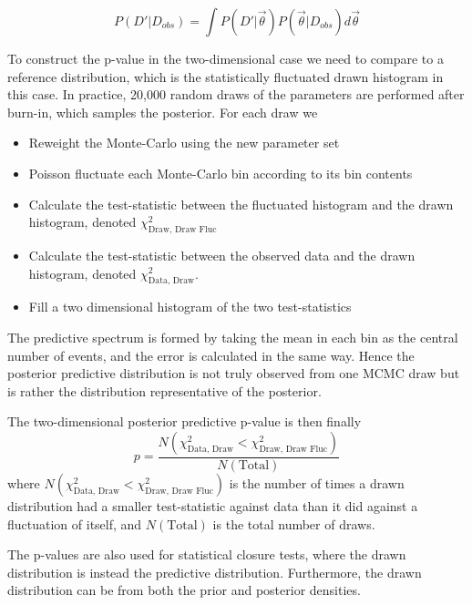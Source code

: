 \begin{equation}
P(D'|D_{obs}) = \int P(D'|\vec{\theta}) P(\vec{\theta}|D_{obs}) d\vec{\theta}
\end{equation}

To construct the p-value in the two-dimensional case we need to compare to a reference distribution, which is the statistically fluctuated drawn histogram in this case. In practice, 20,000 random draws of the parameters are performed after burn-in, which samples the posterior. For each draw we
\begin{itemize}
	\item Reweight the Monte-Carlo using the new parameter set
	\item Poisson fluctuate each Monte-Carlo bin according to its bin contents
	\item Calculate the test-statistic between the fluctuated histogram and the drawn histogram, denoted $\chi^2_{\text{Draw, Draw Fluc}}$
	\item Calculate the test-statistic between the observed data and the drawn histogram, denoted $\chi^2_{\text{Data, Draw}}$.
	\item Fill a two dimensional histogram of the two test-statistics
\end{itemize}
The predictive spectrum is formed by taking the mean in each bin as the central number of events, and the error is calculated in the same way. Hence the posterior predictive distribution is not truly observed from one MCMC draw but is rather the distribution representative of the posterior.

The two-dimensional posterior predictive p-value is then finally
\begin{equation}
p = \frac{N\left(\chi^2_{\text{Data, Draw}} < \chi^2_{\text{Draw, Draw Fluc}}\right)}{N\left(\text{Total}\right)}
\end{equation}
where $N\left(\chi^2_{\text{Data, Draw}} < \chi^2_{\text{Draw, Draw Fluc}}\right)$ is the number of times a drawn distribution had a smaller test-statistic against data than it did against a fluctuation of itself, and $N(\text{Total})$ is the total number of draws.

The p-values are also used for statistical closure tests, where the drawn distribution is instead the predictive distribution. Furthermore, the drawn distribution can be from both the prior and posterior densities.